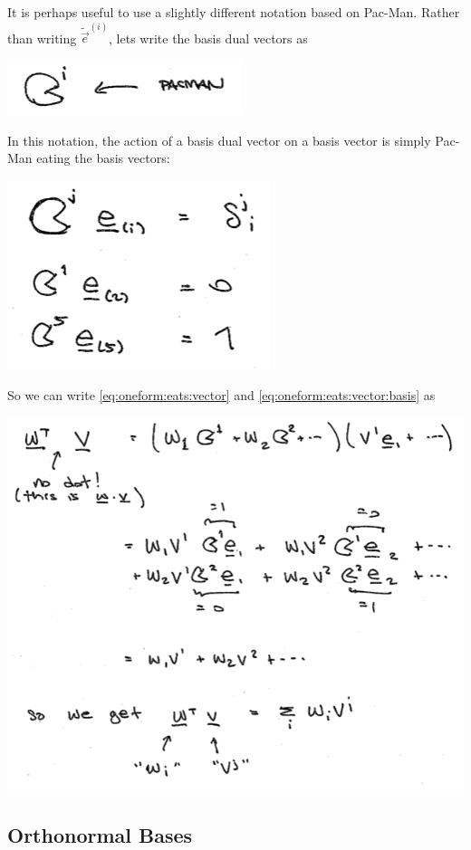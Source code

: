 It is perhaps useful to use a slightly different notation based on Pac-Man. Rather than writing $\tilde{\vec{e}}^{(i)}$, lets write the basis dual vectors as
\begin{center}
\includegraphics[width=.4\textwidth]{figures/lec05_pacman.png}
\end{center}
In this notation, the action of a basis dual vector on a basis vector is simply Pac-Man eating the basis vectors:
\begin{center}
\includegraphics[width=.4\textwidth]{figures/lec05_paceats.png}
\end{center}
So we can write \eqref{eq:oneform:eats:vector} and \eqref{eq:oneform:eats:vector:basis} as
\begin{center}
\includegraphics[width=.7\textwidth]{figures/lec05_paccontract.png}
\end{center}






\subsection{Orthonormal Bases}

